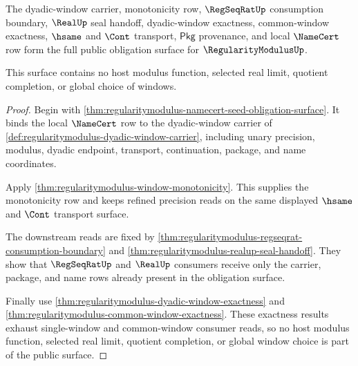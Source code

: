 \begin{theorem}
\label{thm:regularitymodulus-obligation-completeness}
The dyadic-window carrier, monotonicity row, $\RegSeqRatUp$ consumption
boundary, $\RealUp$ seal handoff, dyadic-window exactness, common-window
exactness, $\hsame$ and $\Cont$ transport, $\mathsf{Pkg}$ provenance, and
local $\NameCert$ row form the full public obligation surface for
$\RegularityModulusUp$.

This surface contains no host modulus function, selected real limit, quotient
completion, or global choice of windows.
\end{theorem}
\begin{proof}
Begin with \autoref{thm:regularitymodulus-namecert-seed-obligation-surface}.
It binds the local $\NameCert$ row to the dyadic-window carrier of
\autoref{def:regularitymodulus-dyadic-window-carrier}, including unary
precision, modulus, dyadic endpoint, transport, continuation, package, and
name coordinates.

Apply \autoref{thm:regularitymodulus-window-monotonicity}. This supplies the
monotonicity row and keeps refined precision reads on the same displayed
$\hsame$ and $\Cont$ transport surface.

The downstream reads are fixed by
\autoref{thm:regularitymodulus-regseqrat-consumption-boundary} and
\autoref{thm:regularitymodulus-realup-seal-handoff}. They show that
$\RegSeqRatUp$ and $\RealUp$ consumers receive only the carrier, package, and
name rows already present in the obligation surface.

Finally use \autoref{thm:regularitymodulus-dyadic-window-exactness} and
\autoref{thm:regularitymodulus-common-window-exactness}. These exactness
results exhaust single-window and common-window consumer reads, so no host
modulus function, selected real limit, quotient completion, or global window
choice is part of the public surface.
\end{proof}

